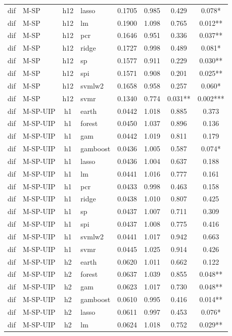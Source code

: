 \begin{ThreePartTable}
\begin{longtable}[t]{llclcccc}
dif & M-SP & h12 & lasso & 0.1705 & 0.985 & 0.429 & 0.078*\\
dif & M-SP & h12 & lm & 0.1900 & 1.098 & 0.765 & 0.012**\\
dif & M-SP & h12 & pcr & 0.1646 & 0.951 & 0.336 & 0.037**\\
dif & M-SP & h12 & ridge & 0.1727 & 0.998 & 0.489 & 0.081*\\
dif & M-SP & h12 & sp & 0.1577 & 0.911 & 0.229 & 0.030**\\
dif & M-SP & h12 & spi & 0.1571 & 0.908 & 0.201 & 0.025**\\
dif & M-SP & h12 & svmlw2 & 0.1658 & 0.958 & 0.257 & 0.060*\\
dif & M-SP & h12 & svmr & 0.1340 & 0.774 & 0.031** & 0.002***\\
\addlinespace
dif & M-SP-UIP & h1 & earth & 0.0442 & 1.018 & 0.885 & 0.373\\
dif & M-SP-UIP & h1 & forest & 0.0450 & 1.037 & 0.896 & 0.136\\
dif & M-SP-UIP & h1 & gam & 0.0442 & 1.019 & 0.811 & 0.179\\
dif & M-SP-UIP & h1 & gamboost & 0.0436 & 1.005 & 0.587 & 0.074*\\
dif & M-SP-UIP & h1 & lasso & 0.0436 & 1.004 & 0.637 & 0.188\\
dif & M-SP-UIP & h1 & lm & 0.0441 & 1.016 & 0.777 & 0.161\\
dif & M-SP-UIP & h1 & pcr & 0.0433 & 0.998 & 0.463 & 0.158\\
dif & M-SP-UIP & h1 & ridge & 0.0438 & 1.010 & 0.807 & 0.425\\
dif & M-SP-UIP & h1 & sp & 0.0437 & 1.007 & 0.711 & 0.309\\
dif & M-SP-UIP & h1 & spi & 0.0437 & 1.008 & 0.775 & 0.416\\
dif & M-SP-UIP & h1 & svmlw2 & 0.0441 & 1.017 & 0.942 & 0.663\\
dif & M-SP-UIP & h1 & svmr & 0.0445 & 1.025 & 0.914 & 0.426\\
\addlinespace
dif & M-SP-UIP & h2 & earth & 0.0620 & 1.011 & 0.662 & 0.122\\
dif & M-SP-UIP & h2 & forest & 0.0637 & 1.039 & 0.855 & 0.048**\\
dif & M-SP-UIP & h2 & gam & 0.0623 & 1.017 & 0.730 & 0.048**\\
dif & M-SP-UIP & h2 & gamboost & 0.0610 & 0.995 & 0.416 & 0.014**\\
dif & M-SP-UIP & h2 & lasso & 0.0611 & 0.997 & 0.453 & 0.076*\\
dif & M-SP-UIP & h2 & lm & 0.0624 & 1.018 & 0.752 & 0.029**\\

\end{longtable}
\end{ThreePartTable}
